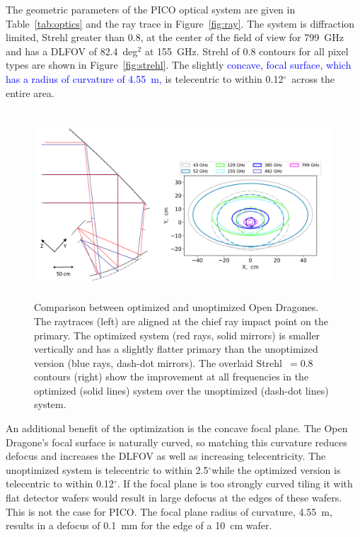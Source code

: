 \documentclass[]{spie}  %
\newcommand{\comb}[1]{\textcolor{blue}{#1}}
\newcommand{\dgr}{$^\circ$}
\begin{document}
The geometric parameters of the PICO optical system are given in Table~\ref{tab:optics} and the ray trace in Figure~\ref{fig:ray}. The 
system is diffraction limited, Strehl greater than 0.8, at the center of the field of view for 799~GHz and has a DLFOV of 82.4~deg$^2$ at 
155~GHz.  Strehl of 0.8 contours for all pixel types are shown in Figure~\ref{fig:strehl}. 
The slightly \comb{concave, focal surface, which has a radius of curvature of 4.55~m,} is telecentric to 
within 0.12\dgr\ across the entire area.



\begin{figure} [ht]
\begin{center}
\includegraphics[height=7cm]{jpl_vs_V3D.png}
\end{center}
\caption { \label{fig:compare} 
Comparison between optimized and unoptimized Open Dragones.  The raytraces (left) are aligned at the chief ray impact point on the primary. 
The optimized system (red rays, solid mirrors) is smaller vertically and has a slightly flatter primary than the unoptimized version 
(blue rays, dash-dot mirrors). The overlaid Strehl~$=0.8$ contours (right) show the improvement at 
all frequencies in the optimized (solid lines) system over the unoptimized (dash-dot lines) system. 
}
\end{figure} 

An additional benefit of the optimization is the concave focal plane. The Open Dragone's focal surface is naturally curved, so matching this 
curvature reduces defocus and increases the DLFOV as well as increasing telecentricity.  The unoptimized system is telecentric to within 
2.5\dgr while the optimized version is telecentric to within 0.12\dgr. If the focal plane is too strongly curved tiling it with flat detector 
wafers would result in large defocus at the edges of these wafers.  This is not the case for PICO. The focal plane radius of curvature, 4.55~m, 
results in a defocus of 0.1~mm for the edge of a 10~cm wafer. 
\end{document}
